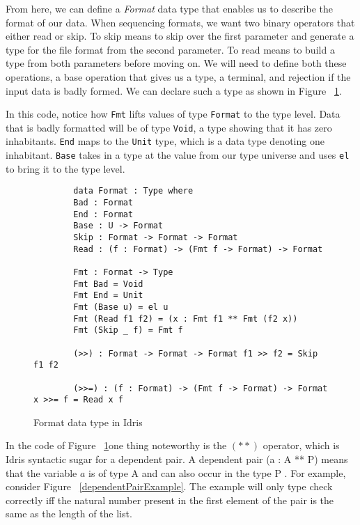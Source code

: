 From here, we can define a \textit{Format} data type that enables us to describe
the format of our data. When sequencing formats, we want two binary operators
that either read or skip. To skip means to skip over the first parameter and
generate a type for the file format from the second parameter. To read means to
build a type from both parameters before moving on. We will need to define both
these operations, a base operation that gives us a type, a terminal, and
rejection if the input data is badly formed. We can declare such a type as
shown in Figure ~\ref{formatDeclaration}. 

In this code, notice how \texttt{Fmt} lifts values of type \texttt{Format} to
the type level. Data that is badly formatted will be of type \texttt{Void}, a
type showing that it has zero inhabitants. \texttt{End} maps to the
\texttt{Unit} type, which is a data type denoting one inhabitant. \texttt{Base}
takes in a type at the value from our type universe and uses \texttt{el} to
bring it to the type level. 

\begin{figure}[ht!!!!!!]
    \caption{Format data type in Idris \protect\cite{power_of_pi}}
    \label{formatDeclaration}
    \begin{lstlisting}
        data Format : Type where 
        Bad : Format 
        End : Format
        Base : U -> Format
        Skip : Format -> Format -> Format 
        Read : (f : Format) -> (Fmt f -> Format) -> Format

        Fmt : Format -> Type 
        Fmt Bad = Void 
        Fmt End = Unit 
        Fmt (Base u) = el u
        Fmt (Read f1 f2) = (x : Fmt f1 ** Fmt (f2 x)) 
        Fmt (Skip _ f) = Fmt f

        (>>) : Format -> Format -> Format f1 >> f2 = Skip f1 f2

        (>>=) : (f : Format) -> (Fmt f -> Format) -> Format x >>= f = Read x f
    \end{lstlisting}
\end{figure}

In the code of Figure ~\ref{formatDeclaration}\footnotemark[\ref{idris_source}]
one thing noteworthy is the $(**)$ operator, which is Idris syntactic sugar for
a dependent pair. A dependent pair (a : A ** P) means that the variable $a$
is of type A and can also occur in the type P \cite{tdd_book}. For example,
consider Figure ~\ref{dependentPairExample}. The example will only type check
correctly iff the natural number present in the first element of the pair is the
same as the length of the list. 

